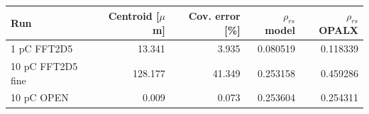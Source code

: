 \begin{tabular}{lrrrr}
\toprule
Run & Centroid [$\mu$m] & Cov. error [\%] & $\rho_{rs}$ model & $\rho_{rs}$ OPALX \\
\midrule
1 pC FFT2D5 & 13.341 & 3.935 & 0.080519 & 0.118339 \\
10 pC FFT2D5 fine & 128.177 & 41.349 & 0.253158 & 0.459286 \\
10 pC OPEN & 0.009 & 0.073 & 0.253604 & 0.254311 \\
\bottomrule
\end{tabular}
